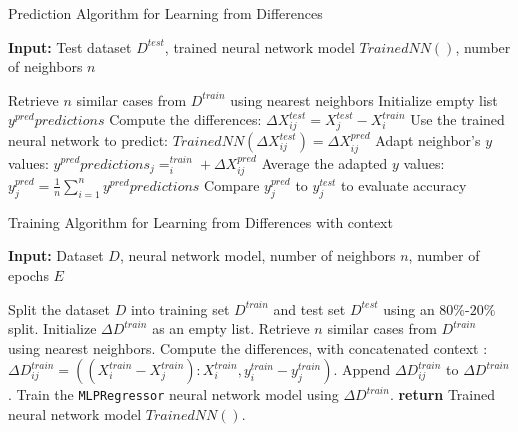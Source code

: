 \documentclass[a4paper, 12pt]{report}
\begin{document}
\begin{algorithm}
	\caption{Prediction Algorithm for Learning from Differences}
	\label{alg:learning_from_differences_predict_alg2}

	\textbf{Input:} Test dataset $D^{test}$, trained neural network model $Trained NN()$, number of neighbors $n$
	\begin{algorithmic}
            \State Retrieve $n$ similar cases from $D^{train}$ using nearest neighbors
			\State Initialize empty list $y^{pred}predictions$
                \State Compute the differences: $\Delta X^{test}_{ij} = X^{test}_j - X^{train}_i$
                \State Use the trained neural network to predict: $Trained NN(\Delta X^{test}_{ij}) = {\Delta X^{pred}_{ij}}$
                \State Adapt neighbor's $y$ values: $y^{pred}predictions_j = ^{train}_i + \Delta X^{pred}_{ij}$
            \EndFor
            \State Average the adapted $y$ values: $y^{pred}_j = \frac{1}{n} \sum_{i=1}^{n} y^{pred}predictions$
			\State Compare $y^{pred}_j$ to $y^{test}_j$ to evaluate accuracy
        \EndFor
    \end{algorithmic}
\end{algorithm}

\begin{algorithm}
	\caption{Training Algorithm for Learning from Differences with context}
	\label{alg:learning_from_differences_variant_train_alg3}

	\textbf{Input:} Dataset $D$, neural network model, number of neighbors $n$, number of epochs $E$

	\begin{algorithmic}[1]
        \State Split the dataset $D$ into training set $D^{train}$ and test set $D^{test}$ using an $80\%$-$20\%$ split.
        \State Initialize $\Delta D^{train}$ as an empty list.
            \State Retrieve $n$ similar cases from $D^{train}$ using nearest neighbors.
                \State Compute the differences, with concatenated context : $\Delta D^{train}_{ij} = ((X^{train}_i - X^{train}_j):X^{train}_i, y^{train}_i - y^{train}_j)$.
                \State Append $\Delta D^{train}_{ij}$ to $\Delta D^{train}$.
            \EndFor
        \EndFor
        \State Train the \texttt{MLPRegressor} neural network model using $\Delta D^{train}$.
        \State \textbf{return} Trained neural network model $Trained NN()$.
    \end{algorithmic}
\end{algorithm}
\end{document}
